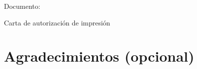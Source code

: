 \documentclass[oneside]{book}%
\begin{document}
\newpage

\begin{center}
    \Huge{Documento: }
    
    \bigskip
    
    \LARGE{Carta de autorización de impresión}

\end{center}

\newpage



\chapter*{Agradecimientos (opcional)}



\newpage

\tableofcontents

\newpage

\listoffigures

\newpage























\backmatter


\nocite{*}
\printbibliography[
heading=bibnumbered,
title={Referencias}
]

\end{document}
